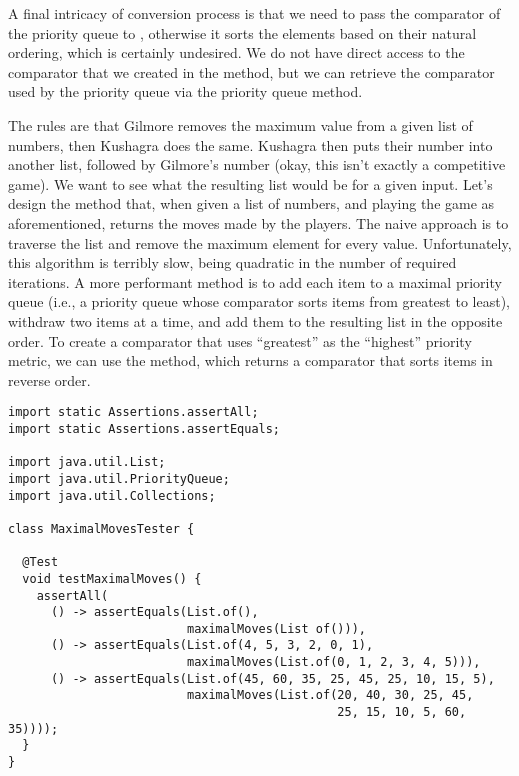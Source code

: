 A final intricacy of conversion process is that we need to pass the comparator of the priority queue to , otherwise it sorts the elements based on their natural ordering, which is certainly undesired. 
We do not have direct access to the comparator that we created in the  method, but we can retrieve the comparator used by the priority queue via the priority queue  method. 

The rules are that Gilmore removes the maximum value from a given list of numbers, then Kushagra does the same.
Kushagra then puts their number into another list, followed by Gilmore's number (okay, this isn't exactly a competitive game).
We want to see what the resulting list would be for a given input.
Let's design the  method that, when given a list of numbers, and playing the game as aforementioned, returns the moves made by the players.
The naive approach is to traverse the list and remove the maximum element for every value. 
Unfortunately, this algorithm is terribly slow, being quadratic in the number of required iterations.
A more performant method is to add each item to a maximal priority queue (i.e., a priority queue whose comparator sorts items from greatest to least), withdraw two items at a time, and add them to the resulting list in the opposite order.
To create a comparator that uses ``greatest'' as the ``highest'' priority metric, we can use the  method, which returns a comparator that sorts items in reverse order.

\begin{lstlisting}[language=MyJava]
import static Assertions.assertAll;
import static Assertions.assertEquals;

import java.util.List;
import java.util.PriorityQueue;
import java.util.Collections;

class MaximalMovesTester {

  @Test
  void testMaximalMoves() {
    assertAll(
      () -> assertEquals(List.of(), 
                         maximalMoves(List of())),
      () -> assertEquals(List.of(4, 5, 3, 2, 0, 1), 
                         maximalMoves(List.of(0, 1, 2, 3, 4, 5))),
      () -> assertEquals(List.of(45, 60, 35, 25, 45, 25, 10, 15, 5), 
                         maximalMoves(List.of(20, 40, 30, 25, 45, 
                                              25, 15, 10, 5, 60, 35))));
  }
}
\end{lstlisting}

